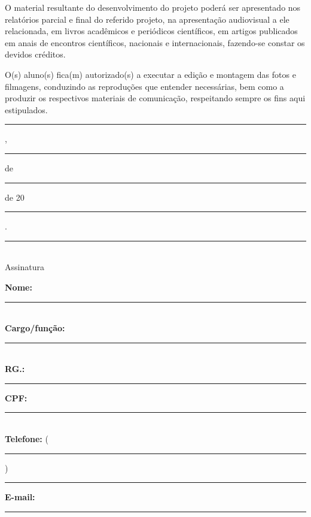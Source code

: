\vspace{0.2cm}

O material resultante do desenvolvimento do projeto poderá ser apresentado nos
relatórios parcial e final do referido projeto, na apresentação audiovisual a
ele relacionada, em livros acadêmicos e periódicos científicos, em artigos
publicados em anais de encontros científicos, nacionais e internacionais,
fazendo-se constar os devidos créditos.

\vspace{0.15cm}

O(s) aluno(s) fica(m) autorizado(s) a executar a edição e montagem das fotos e
filmagens, conduzindo as reproduções que entender necessárias, bem como a
produzir os respectivos materiais de comunicação, respeitando sempre os fins
aqui estipulados.

\vspace{0.4cm}

\noindent
\rule{5cm}{0.4pt}, \rule{1cm}{0.4pt} de \rule{2.5cm}{0.4pt} de 20\rule{0.8cm}{0.4pt}.

\vspace{0.5cm}

\begin{center}
    \rule{8cm}{0.4pt}\\
    Assinatura
\end{center}

\vspace{0.2cm}

\noindent
\textbf{Nome:} \rule{10cm}{0.4pt}\\[0.15cm]
\textbf{Cargo/função:} \rule{8.5cm}{0.4pt}\\[0.15cm]
\textbf{RG.:} \rule{4.5cm}{0.4pt} \hfill \textbf{CPF:} \rule{4.5cm}{0.4pt}\\[0.15cm]
\textbf{Telefone:} (\rule{0.5cm}{0.4pt}) \rule{3cm}{0.4pt} \hfill \textbf{E-mail:} \rule{4cm}{0.4pt}
